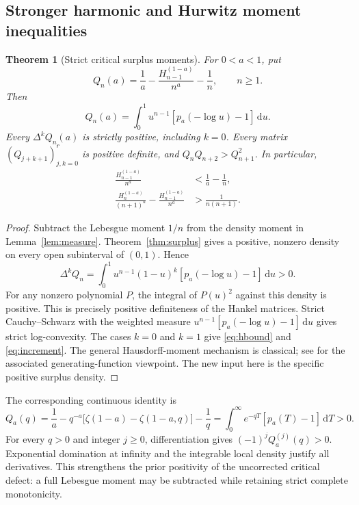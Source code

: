 \documentclass[11pt]{article}
\numberwithin{equation}{section}
\newtheorem{theorem}{Theorem}[section]
\theoremstyle{definition}\newtheorem{definition}[theorem]{Definition}
\theoremstyle{remark}\newtheorem{remark}[theorem]{Remark}
\newcommand{\dd}{\,\mathrm d}
\begin{document}
\subsection{Stronger harmonic and Hurwitz moment inequalities}
\begin{theorem}[Strict critical surplus moments]\label{thm:moments}
For $0<a<1$, put
\begin{equation}\label{eq:Qn}
 Q_n(a)=\frac1a-\frac{H_{n-1}^{(1-a)}}{n^a}-\frac1n,
 \qquad n\ge1.
\end{equation}
Then
\begin{equation}\label{eq:Qmoment}
 Q_n(a)=\int_0^1u^{n-1}[p_a(-\log u)-1]\dd u.
\end{equation}
Every $\Delta^kQ_n(a)$ is strictly positive, including $k=0$.
Every matrix $(Q_{j+k+1})_{j,k=0}^r$ is positive definite, and
$Q_nQ_{n+2}>Q_{n+1}^2$. In particular,
\begin{align}
 \frac{H_{n-1}^{(1-a)}}{n^a}&<\frac1a-\frac1n,
 \label{eq:hbound}\\
 \frac{H_n^{(1-a)}}{(n+1)^a}
 -\frac{H_{n-1}^{(1-a)}}{n^a}&>\frac1{n(n+1)}.
 \label{eq:increment}
\end{align}
\end{theorem}
\begin{proof}
Subtract the Lebesgue moment $1/n$ from the density moment in
Lemma~\ref{lem:measure}. Theorem~\ref{thm:surplus} gives a positive,
nonzero density on every open subinterval of $(0,1)$. Hence
\[
 \Delta^kQ_n=\int_0^1u^{n-1}(1-u)^k[p_a(-\log u)-1]\dd u>0.
\]
For any nonzero polynomial $P$, the integral of $P(u)^2$ against this
density is positive. This is precisely positive definiteness of the
Hankel matrices. Strict Cauchy--Schwarz with the weighted measure
$u^{n-1}[p_a(-\log u)-1]\dd u$ gives strict log-convexity.
The cases $k=0$ and $k=1$ give \eqref{eq:hbound} and
\eqref{eq:increment}. The general Hausdorff-moment mechanism is
classical; see \cite{liu-pego} for the associated generating-function
viewpoint. The new input here is the specific positive surplus density.
\end{proof}

The corresponding continuous identity is
\begin{equation}\label{eq:Qcontinuous}
 Q_a(q)=\frac1a-q^{-a}\bigl[\zeta(1-a)-\zeta(1-a,q)\bigr]-\frac1q
 =\int_0^\infty e^{-qT}[p_a(T)-1]\dd T>0.
\end{equation}
For every $q>0$ and integer $j\ge0$, differentiation gives
$(-1)^jQ_a^{(j)}(q)>0$. Exponential domination at infinity and the
integrable local density justify all derivatives. This strengthens the
prior positivity of the uncorrected critical defect: a full Lebesgue
moment may be subtracted while retaining strict complete monotonicity.
\end{document}
